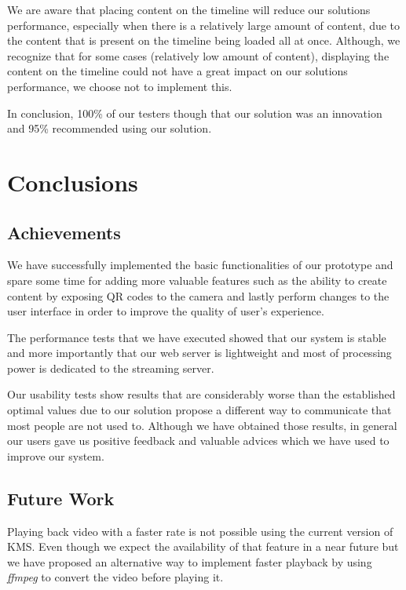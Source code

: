 \documentclass[conference,compsoc,a4paper]{IEEEtran}
\begin{document}
We are aware that placing content on the timeline will reduce our solutions performance, especially when there is a relatively large amount of content, due to the content that is present on the timeline being loaded all at once. Although, we recognize that for some cases (relatively low amount of content), displaying the content on the timeline could not have a great impact on our solutions performance, we choose not to implement this.

In conclusion, 100\% of our testers though that our solution was an innovation and 95\% recommended using our solution.




\section{Conclusions}
\subsection{Achievements}
\label{section:achievements}

	We have successfully implemented the basic functionalities of our prototype and spare some time for adding more valuable features such as the ability to create content by exposing \gls{QR} codes to the camera and lastly perform changes to the user interface in order to improve the quality of user's experience.

	The performance tests that we have executed showed that our system is stable and more importantly that our web server is lightweight and most of processing power is dedicated to the streaming server.

	Our usability tests show results that are considerably worse than the established optimal values due to our solution propose a different way to communicate that most people are not used to. Although we have obtained those results, in general our users gave us positive feedback and valuable advices which we have used to improve our system. 

\subsection{Future Work}
\label{section:future}
	Playing back video with a faster rate is not possible using the current version of \gls{KMS}. Even though we expect the availability of that feature in a near future but we have proposed an alternative way to implement faster playback by using \emph{ffmpeg} to convert the video before playing it.
\end{document}
